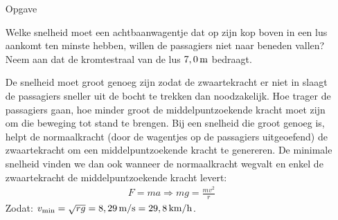 


\thispagestyle{empty}
\phantom{}\bigskip\bigskip

\begin{enumerate}


\item[Opgave]\begin{minipage}[t]{0.5\textwidth}
Welke snelheid moet een achtbaanwagentje dat op zijn kop boven in een lus aankomt ten minste hebben, willen de passagiers niet naar beneden vallen? Neem aan dat de kromtestraal van de lus $7,0\rm\,m$ bedraagt.
\end{minipage}
\hspace{5mm}
\begin{minipage}[t]{0.45\textwidth}
\end{minipage}


\begin{oplossing}
De snelheid moet groot genoeg zijn zodat de zwaartekracht er niet in slaagt de passagiers sneller uit de bocht te trekken dan noodzakelijk. Hoe trager de passagiers gaan, hoe minder groot de middelpuntzoekende kracht moet zijn om die beweging tot stand te brengen. 
\newline
Bij een snelheid die groot genoeg is, helpt de normaalkracht (door de wagentjes op de passagiers uitgeoefend) de zwaartekracht om een middelpuntzoekende kracht te genereren. De minimale snelheid vinden we dan ook wanneer de normaalkracht wegvalt en enkel de zwaartekracht de middelpuntzoekende kracht levert:
\begin{eqnarray*}
		F=ma\Rightarrow mg=\frac{mv^2}{r}
\end{eqnarray*}
Zodat:
$v_{\rm min}=\sqrt{rg}=8,29\rm\,m/s=29,8\rm\,km/h$.
\end{oplossing}

\end{enumerate}